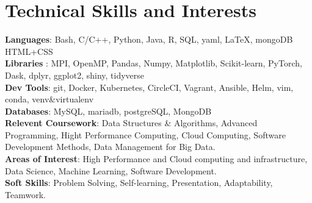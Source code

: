 \section{\textbf{Technical Skills and Interests}}
 \begin{itemize}[leftmargin=0.05in, label={}]
    \small{\item{
     \textbf{Languages}{: Bash, C/C++, Python, Java, R, SQL, yaml,  LaTeX, mongoDB HTML+CSS } \\
     \textbf{Libraries }{: MPI, OpenMP, Pandas, Numpy, Matplotlib, Scikit-learn, PyTorch, Dask, dplyr, ggplot2, shiny, tidyverse}\\ 
     \textbf{Dev Tools}{: git, Docker, Kubernetes, CircleCI, Vagrant, Ansible, Helm, vim, conda, venv\&virtualenv}\\
     \textbf{Databases}{: MySQL, mariadb, postgreSQL, MongoDB} \\
     
     \textbf{Relevent Coursework}{: Data Structures \& Algorithms, Advanced Programming, Hight Performance Computing, Cloud Computing, Software Development Methods, Data Management for Big Data.} \\

     \textbf{Areas of Interest}{: High Performance and Cloud computing and infrastructure, Data Science, Machine Learning, Software Development.} \\
     \textbf{Soft Skills}{: Problem Solving, Self-learning, Presentation, Adaptability, Teamwork.} \\
    }}
 \end{itemize}